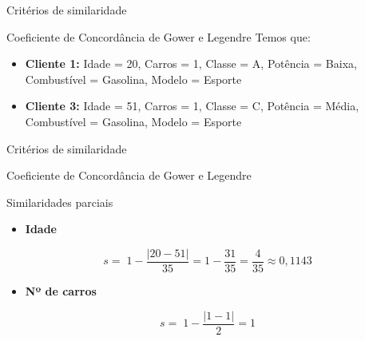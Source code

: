 \documentclass[
  ignorenonframetext,
  aspectratio=169,
]{beamer}
\providecommand{\tightlist}{%
  \setlength{\itemsep}{0pt}\setlength{\parskip}{0pt}}
\begin{document}
\begin{frame}{Critérios de similaridade}
\label{crituxe9rios-de-similaridade-15}
\begin{block}{Coeficiente de Concordância de Gower e Legendre}
\label{coeficiente-de-concorduxe2ncia-de-gower-e-legendre-8}
Temos que:

\begin{itemize}
\item
  \textbf{Cliente 1:} Idade = 20, Carros = 1, Classe = A, Potência =
  Baixa, Combustível = Gasolina, Modelo = Esporte
\item
  \textbf{Cliente 3:} Idade = 51, Carros = 1, Classe = C, Potência =
  Média, Combustível = Gasolina, Modelo = Esporte
\end{itemize}
\end{block}
\end{frame}

\begin{frame}{Critérios de similaridade}
\label{crituxe9rios-de-similaridade-16}
\begin{block}{Coeficiente de Concordância de Gower e Legendre}
\label{coeficiente-de-concorduxe2ncia-de-gower-e-legendre-9}
\begin{block}{Similaridades parciais}
\label{similaridades-parciais}
\begin{itemize}
\tightlist
\item
  \textbf{Idade}
\end{itemize}

\[
s=\;1-\dfrac{|20-51|}{35}=1-\dfrac{31}{35}=\dfrac{4}{35}\approx 0,1143
\]

\begin{itemize}
\tightlist
\item
  \textbf{Nº de carros}
\end{itemize}

\[
s=\;1-\dfrac{|1-1|}{2}=1
\]
\end{block}
\end{block}
\end{frame}
\end{document}

